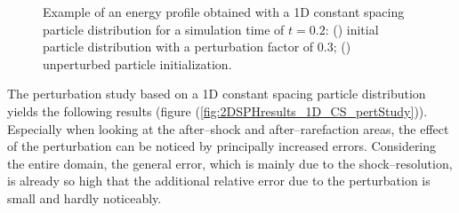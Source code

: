 \documentclass[11pt,a4paper,twoside]{report}
\begin{document}
\begin{figure}[!htbp]

\centering
\label{fig:2DSPHresults_perturbationComparisonProfiles}

\caption[Comparison of perturbed and unperturbed energy profiles]{Example of an energy profile obtained with a 1D constant spacing particle distribution for a simulation time of $t=0.2$: () initial particle distribution with a perturbation factor of $0.3$; () unperturbed particle initialization.}

\end{figure}

 The perturbation study based on a 1D constant spacing particle distribution yields the following results (figure (\ref{fig:2DSPHresults_1D_CS_pertStudy})). Especially when looking at the after--shock and after--rarefaction areas, the effect of the perturbation can be noticed by principally increased  errors. Considering the entire domain, the general error, which is mainly due to the shock--resolution, is already so high that the additional relative error due to the perturbation is small and hardly noticeably.
\end{document}
